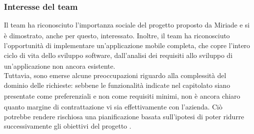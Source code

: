 \documentclass[a4paper,11pt]{article}
\begin{document}
\subsubsection{Interesse del team}
\parbox[t]{\linewidth}{%
Il team ha riconosciuto l'importanza sociale del progetto\textsubscript{}
 proposto da Miriade e si è dimostrato, anche per questo, interessato.
Inoltre, il team ha riconosciuto l'opportunità di implementare un'applicazione mobile completa, che copre l'intero ciclo di vita dello sviluppo software, dall'analisi dei requisiti\textsubscript{}
 allo sviluppo\textsubscript{}
 di un'applicazione non ancora esistente.
\\Tuttavia, sono emerse alcune preoccupazioni riguardo alla complessità del dominio delle richieste: sebbene le funzionalità\textsubscript{}
 indicate nel capitolato\textsubscript{}
 siano presentate come preferenziali e non come requisiti\textsubscript{}
 minimi, non è ancora chiaro quanto margine di contrattazione vi sia effettivamente con l'azienda. Ciò potrebbe rendere rischiosa una pianificazione basata sull'ipotesi di poter ridurre successivamente gli obiettivi del progetto\textsubscript{}
.}
\end{document}
